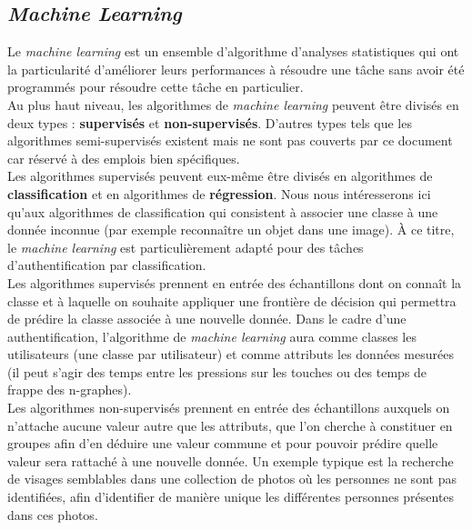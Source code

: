 \subsection{\textit{Machine Learning}}

Le \textit{machine learning} est un ensemble d'algorithme d'analyses statistiques qui ont la particularité d'améliorer leurs performances à résoudre une tâche sans avoir été programmés pour résoudre cette tâche en particulier.\\

Au plus haut niveau, les algorithmes de \textit{machine learning} peuvent être divisés en deux types : \textbf{supervisés} et \textbf{non-supervisés}. D'autres types tels que les algorithmes semi-supervisés existent mais ne sont pas couverts par ce document car réservé à des emplois bien spécifiques.\\

Les algorithmes supervisés peuvent eux-même être divisés en algorithmes de \textbf{classification} et en algorithmes de \textbf{régression}. Nous nous intéresserons ici qu'aux algorithmes de classification qui consistent à associer une classe à une donnée inconnue (par exemple reconnaître un objet dans une image). À ce titre, le \textit{machine learning} est particulièrement adapté pour des tâches d'authentification par classification.\\

Les algorithmes supervisés prennent en entrée des échantillons dont on connaît la classe et à laquelle on souhaite appliquer une frontière de décision qui permettra de prédire la classe associée à une nouvelle donnée. Dans le cadre d'une authentification, l'algorithme de \textit{machine learning} aura comme classes les utilisateurs (une classe par utilisateur) et comme attributs les données mesurées (il peut s'agir des temps entre les pressions sur les touches\cite{giotGREYC} ou des temps de frappe des n-graphes\cite{Hu2008,bergadano2002,gunetti2005}).\\

Les algorithmes non-supervisés prennent en entrée des échantillons auxquels on n'attache aucune valeur autre que les attributs, que l'on cherche à constituer en groupes afin d'en déduire une valeur commune et pour pouvoir prédire quelle valeur sera rattaché à une nouvelle donnée. Un exemple typique est la recherche de visages semblables dans une collection de photos où les personnes ne sont pas identifiées, afin d'identifier de manière unique les différentes personnes présentes dans ces photos.\\

